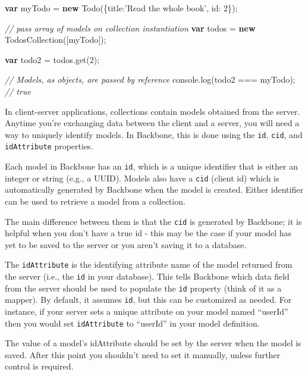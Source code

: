 \documentclass[9pt]{book}
\newenvironment{Shaded}{}{}
\newcommand{\KeywordTok}[1]{\textcolor[rgb]{0.00,0.44,0.13}{\textbf{{#1}}}}
\newcommand{\DataTypeTok}[1]{\textcolor[rgb]{0.56,0.13,0.00}{{#1}}}
\newcommand{\DecValTok}[1]{\textcolor[rgb]{0.25,0.63,0.44}{{#1}}}
\newcommand{\StringTok}[1]{\textcolor[rgb]{0.25,0.44,0.63}{{#1}}}
\newcommand{\CommentTok}[1]{\textcolor[rgb]{0.38,0.63,0.69}{\textit{{#1}}}}
\newcommand{\OtherTok}[1]{\textcolor[rgb]{0.00,0.44,0.13}{{#1}}}
\newcommand{\FunctionTok}[1]{\textcolor[rgb]{0.02,0.16,0.49}{{#1}}}
\newcommand{\NormalTok}[1]{{#1}}
\begin{document}
\begin{Shaded}
\begin{Highlighting}[]
\KeywordTok{var} \NormalTok{myTodo = }\KeywordTok{new} \FunctionTok{Todo}\NormalTok{(\{}\DataTypeTok{title}\NormalTok{:}\StringTok{'Read the whole book'}\NormalTok{, }\DataTypeTok{id}\NormalTok{: }\DecValTok{2}\NormalTok{\});}

\CommentTok{// pass array of models on collection instantiation}
\KeywordTok{var} \NormalTok{todos = }\KeywordTok{new} \FunctionTok{TodosCollection}\NormalTok{([myTodo]);}

\KeywordTok{var} \NormalTok{todo2 = }\OtherTok{todos}\NormalTok{.}\FunctionTok{get}\NormalTok{(}\DecValTok{2}\NormalTok{);}

\CommentTok{// Models, as objects, are passed by reference}
\OtherTok{console}\NormalTok{.}\FunctionTok{log}\NormalTok{(todo2 === myTodo); }\CommentTok{// true}
\end{Highlighting}
\end{Shaded}

In client-server applications, collections contain models obtained from
the server. Anytime you're exchanging data between the client and a
server, you will need a way to uniquely identify models. In Backbone,
this is done using the \texttt{id}, \texttt{cid}, and
\texttt{idAttribute} properties.

Each model in Backbone has an \texttt{id}, which is a unique identifier
that is either an integer or string (e.g., a UUID). Models also have a
\texttt{cid} (client id) which is automatically generated by Backbone
when the model is created. Either identifier can be used to retrieve a
model from a collection.

The main difference between them is that the \texttt{cid} is generated
by Backbone; it is helpful when you don't have a true id - this may be
the case if your model has yet to be saved to the server or you aren't
saving it to a database.

The \texttt{idAttribute} is the identifying attribute name of the model
returned from the server (i.e., the \texttt{id} in your database). This
tells Backbone which data field from the server should be used to
populate the \texttt{id} property (think of it as a mapper). By default,
it assumes \texttt{id}, but this can be customized as needed. For
instance, if your server sets a unique attribute on your model named
``userId'' then you would set \texttt{idAttribute} to ``userId'' in your
model definition.

The value of a model's idAttribute should be set by the server when the
model is saved. After this point you shouldn't need to set it manually,
unless further control is required.
\end{document}
